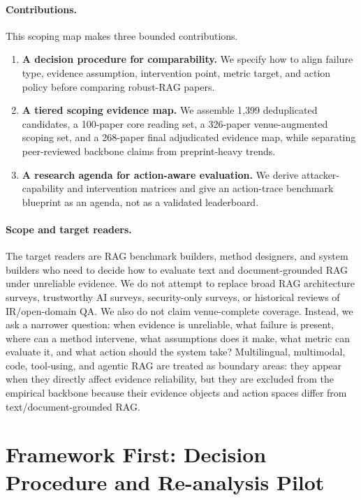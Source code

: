 \documentclass[11pt]{article}
\begin{document}
\paragraph{Contributions.}
This scoping map makes three bounded contributions.
\begin{enumerate}[leftmargin=*]
    \item \textbf{A decision procedure for comparability.} We specify how to align failure type, evidence assumption, intervention point, metric target, and action policy before comparing robust-RAG papers.
    \item \textbf{A tiered scoping evidence map.} We assemble 1,399 deduplicated candidates, a 100-paper core reading set, a 326-paper venue-augmented scoping set, and a 268-paper final adjudicated evidence map, while separating peer-reviewed backbone claims from preprint-heavy trends.
    \item \textbf{A research agenda for action-aware evaluation.} We derive attacker-capability and intervention matrices and give an action-trace benchmark blueprint as an agenda, not as a validated leaderboard.
\end{enumerate}




\paragraph{Scope and target readers.}
The target readers are RAG benchmark builders, method designers, and system builders who need to decide how to evaluate text and document-grounded RAG under unreliable evidence. We do not attempt to replace broad RAG architecture surveys, trustworthy AI surveys, security-only surveys, or historical reviews of IR/open-domain QA. We also do not claim venue-complete coverage. Instead, we ask a narrower question: when evidence is unreliable, what failure is present, where can a method intervene, what assumptions does it make, what metric can evaluate it, and what action should the system take? Multilingual, multimodal, code, tool-using, and agentic RAG are treated as boundary areas: they appear when they directly affect evidence reliability, but they are excluded from the empirical backbone because their evidence objects and action spaces differ from text/document-grounded RAG.

\section{Framework First: Decision Procedure and Re-analysis Pilot}
\label{sec:framework-first}
\end{document}
